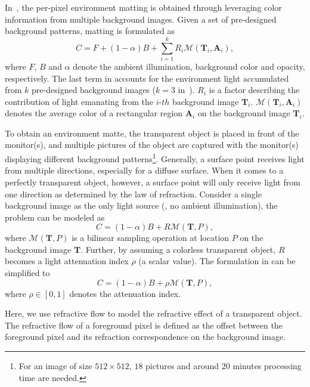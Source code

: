 In~\cite{zongker1999environment}, the per-pixel environment matting is obtained through leveraging color information from multiple background images. Given a set of pre-designed background patterns, matting is formulated as
\begin{equation}
    \label{eq:em_origin}
    C = F + (1-\alpha)B + \sum_{i=1}^{k} R_i \mathcal{M}(\mathbf{T}_i, \mathbf{A}_i),
\end{equation}
where $F$, $B$ and $\alpha$ denote the ambient illumination, background color and opacity, respectively. The last term in  accounts for the environment light accumulated from $k$ pre-designed background images ($k=3$ in~\cite{zongker1999environment}). $R_i$ is a factor describing the contribution of light emanating from the $i$-$th$ background image $\mathbf{T}_i$. $\mathcal{M}(\mathbf{T}_i, \mathbf{A}_i)$ denotes the average color of a rectangular region $\mathbf{A}_i$ on the background image $\mathbf{T}_i$. 

To obtain an environment matte, the transparent object is placed in front of the monitor(s), and multiple pictures of the object are captured with the monitor(s) displaying different background patterns\footnote{For an image of size $512\times 512$, $18$ pictures and around $20$ minutes processing time are needed.}. 
Generally, a surface point receives light from multiple directions, especially for a diffuse surface. When it comes to a perfectly transparent object, however, a surface point will only receive light from one direction as determined by the law of refraction. Consider a single background image as the only light source (\ie, no ambient illumination), the problem can be modeled as
\begin{equation}
    \label{eq:em_simplify1}
    C = (1-\alpha)B + R \mathcal{M}(\mathbf{T}, P),
\end{equation}
where $\mathcal{M}(\mathbf{T}, P)$ is a bilinear sampling operation at location $P$ on the background image $\mathbf{T}$. Further, by assuming a colorless transparent object, $R$ becomes a  light attenuation index $\rho$ (a scalar value). The formulation in  can be simplified to
\begin{equation}
    \label{eq:em_simplify2}
    C = (1-\alpha)B + \rho \mathcal{M}(\mathbf{T}, P),
\end{equation}
where $\rho \in [0, 1]$ denotes the attenuation index.

Here, we use refractive flow to model the refractive effect of a transparent object. The refractive flow of a foreground pixel is defined as the offset between the foreground pixel and its refraction correspondence on the background image. 

